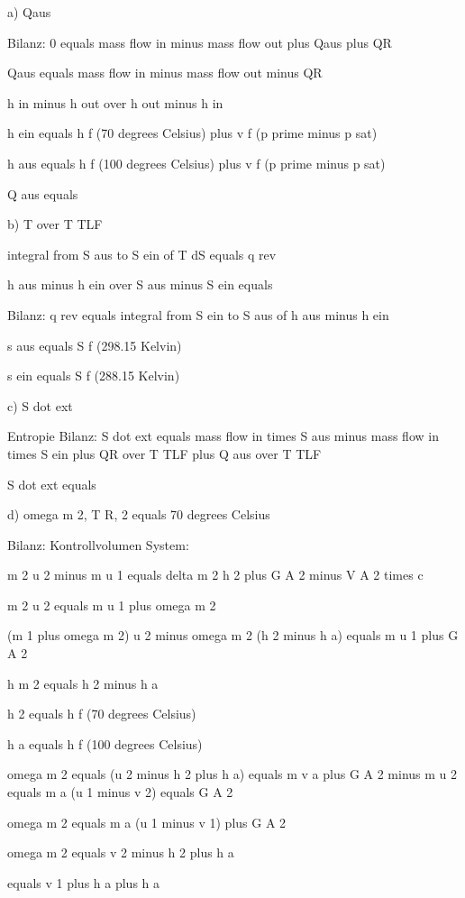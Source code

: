 a) Qaus

Bilanz: 0 equals mass flow in minus mass flow out plus Qaus plus QR

Qaus equals mass flow in minus mass flow out minus QR

h in minus h out over h out minus h in

h ein equals h f (70 degrees Celsius) plus v f (p prime minus p sat)

h aus equals h f (100 degrees Celsius) plus v f (p prime minus p sat)

Q aus equals 

b) T over T TLF

integral from S aus to S ein of T dS equals q rev

h aus minus h ein over S aus minus S ein equals 

Bilanz: q rev equals integral from S ein to S aus of h aus minus h ein

s aus equals S f (298.15 Kelvin)

s ein equals S f (288.15 Kelvin)

c) S dot ext

Entropie Bilanz: S dot ext equals mass flow in times S aus minus mass flow in times S ein plus QR over T TLF plus Q aus over T TLF

S dot ext equals 

d) omega m 2, T R, 2 equals 70 degrees Celsius

Bilanz: Kontrollvolumen System:

m 2 u 2 minus m u 1 equals delta m 2 h 2 plus G A 2 minus V A 2 times c

m 2 u 2 equals m u 1 plus omega m 2

(m 1 plus omega m 2) u 2 minus omega m 2 (h 2 minus h a) equals m u 1 plus G A 2

h m 2 equals h 2 minus h a

h 2 equals h f (70 degrees Celsius)

h a equals h f (100 degrees Celsius)

omega m 2 equals (u 2 minus h 2 plus h a) equals m v a plus G A 2 minus m u 2 equals m a (u 1 minus v 2) equals G A 2

omega m 2 equals m a (u 1 minus v 1) plus G A 2

omega m 2 equals v 2 minus h 2 plus h a

equals v 1 plus h a plus h a